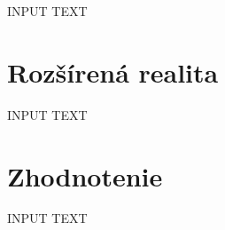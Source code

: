 \documentclass[10pt,slovak,a4paper]{article}
\begin{document}
INPUT TEXT

\section{Rozšírená realita} \label{Augmented_reality}

INPUT TEXT

\section{Zhodnotenie} \label{Evaluation}

INPUT TEXT

%
%
\end{document}
